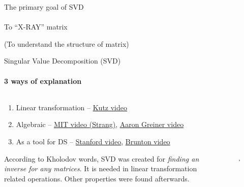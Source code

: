 \documentclass[aspectratio=169]{beamer}
\begin{document}
\begin{frame}[c]{The primary goal of SVD}
\framesubtitle{}
\centering\LARGE
To “X-RAY” matrix

(To understand the structure of matrix)
\end{frame}

\begin{frame}[t]{Singular Value Decomposition (SVD)}
\framesubtitle{3 ways of explanation}
    \begin{columns}[T,onlytextwidth]
        \begin{column}{0.69\textwidth}
            \begin{enumerate}
                \item Linear transformation – \href{https://youtu.be/EokL7E6o1AE}{Kutz video}
                \item Algebraic – \href{https://www.youtube.com/watch?v=rYz83XPxiZo&list=PLUl4u3cNGP63oMNUHXqIUcrkS2PivhN3k&index=8}{MIT video (Strang)}, \href{https://youtu.be/EfZsEFhHcNM}{Aaron Greiner video}
                \item As a tool for DS  – \href{https://youtu.be/P5mlg91as1c}{Stanford video}, \href{https://youtu.be/yA66KsFqUAE}{Brunton video}
            \end{enumerate}

            According to Kholodov words, SVD was created for \textit{finding an inverse for any matrices}. It is needed in linear transformation related operations. Other properties were found afterwards. 
        \end{column}
        \begin{column}{0.29\textwidth}
            \vspace{-1cm}
            \begin{figure}[H]
                \centering\includegraphics[height=6cm,width=1\textwidth,keepaspectratio]{two_buttons.jpg}
                \label{fig:two_buttons.jpg}
            \end{figure}
        \end{column}
    \end{columns}
\end{frame}
\end{document}
